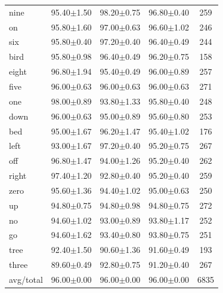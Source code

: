 \documentclass[review]{elsarticle}
\begin{document}
\begin{table}[h!]
\begin{tabular}{lcccc}
		nine      &  95.40$\pm$1.50 &  98.20$\pm$0.75 &  96.80$\pm$0.40 &     259 \\
		on        &  95.80$\pm$1.60 &  97.00$\pm$0.63 &  96.60$\pm$1.02 &     246 \\
		six       &  95.80$\pm$0.40 &  97.20$\pm$0.40 &  96.40$\pm$0.49 &     244 \\
		bird      &  95.80$\pm$0.98 &  96.40$\pm$0.49 &  96.20$\pm$0.75 &     158 \\
		eight     &  96.80$\pm$1.94 &  95.40$\pm$0.49 &  96.00$\pm$0.89 &     257 \\
		five      &  96.00$\pm$0.63 &  96.00$\pm$0.63 &  96.00$\pm$0.63 &     271 \\
		one       &  98.00$\pm$0.89 &  93.80$\pm$1.33 &  95.80$\pm$0.40 &     248 \\
		down      &  96.00$\pm$0.63 &  95.00$\pm$0.89 &  95.60$\pm$0.80 &     253 \\
		bed       &  95.00$\pm$1.67 &  96.20$\pm$1.47 &  95.40$\pm$1.02 &     176 \\
		left      &  93.00$\pm$1.67 &  97.20$\pm$0.40 &  95.20$\pm$0.75 &     267 \\
		off       &  96.80$\pm$1.47 &  94.00$\pm$1.26 &  95.20$\pm$0.40 &     262 \\
		right     &  97.40$\pm$1.20 &  92.80$\pm$0.40 &  95.20$\pm$0.40 &     259 \\
		zero      &  95.60$\pm$1.36 &  94.40$\pm$1.02 &  95.00$\pm$0.63 &     250 \\
		up        &  94.80$\pm$0.75 &  94.80$\pm$0.98 &  94.80$\pm$0.75 &     272 \\
		no        &  94.60$\pm$1.02 &  93.00$\pm$0.89 &  93.80$\pm$1.17 &     252 \\
		go        &  94.60$\pm$1.62 &  93.40$\pm$0.80 &  93.80$\pm$0.75 &     251 \\
		tree      &  92.40$\pm$1.50 &  90.60$\pm$1.36 &  91.60$\pm$0.49 &     193 \\
		three     &  89.60$\pm$0.49 &  92.80$\pm$0.75 &  91.20$\pm$0.40 &     267 \\
		\midrule avg/total &  96.00$\pm$0.00 &  96.00$\pm$0.00 &  96.00$\pm$0.00 &    6835 \\
		\bottomrule
	\end{tabular}
	
\end{table}
\end{document}
